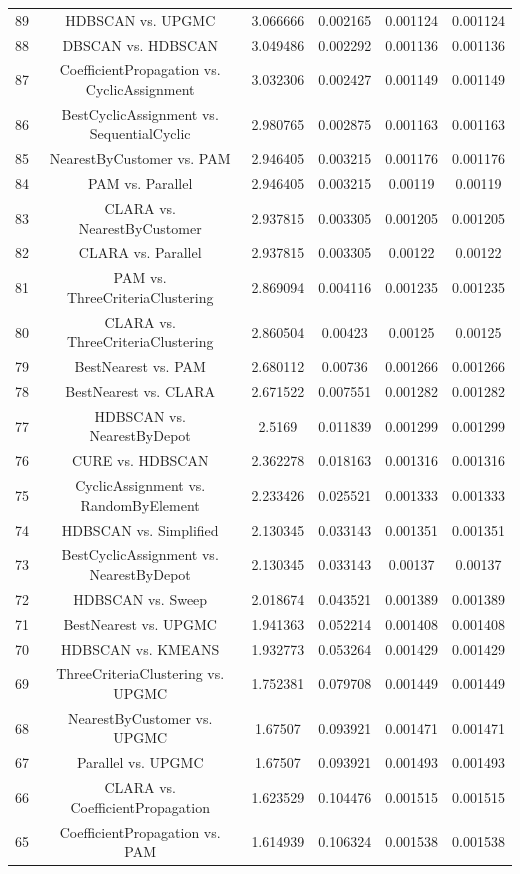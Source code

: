 \documentclass[a4paper,10pt]{article}
\begin{document}
\begin{landscape}
\begin{table}[!htp]
\begin{tabular}{cccccc}
89&HDBSCAN vs. UPGMC&3.066666&0.002165&0.001124&0.001124\\
88&DBSCAN vs. HDBSCAN&3.049486&0.002292&0.001136&0.001136\\
87&CoefficientPropagation vs. CyclicAssignment&3.032306&0.002427&0.001149&0.001149\\
86&BestCyclicAssignment vs. SequentialCyclic&2.980765&0.002875&0.001163&0.001163\\
85&NearestByCustomer vs. PAM&2.946405&0.003215&0.001176&0.001176\\
84&PAM vs. Parallel&2.946405&0.003215&0.00119&0.00119\\
83&CLARA vs. NearestByCustomer&2.937815&0.003305&0.001205&0.001205\\
82&CLARA vs. Parallel&2.937815&0.003305&0.00122&0.00122\\
81&PAM vs. ThreeCriteriaClustering&2.869094&0.004116&0.001235&0.001235\\
80&CLARA vs. ThreeCriteriaClustering&2.860504&0.00423&0.00125&0.00125\\
79&BestNearest vs. PAM&2.680112&0.00736&0.001266&0.001266\\
78&BestNearest vs. CLARA&2.671522&0.007551&0.001282&0.001282\\
77&HDBSCAN vs. NearestByDepot&2.5169&0.011839&0.001299&0.001299\\
76&CURE vs. HDBSCAN&2.362278&0.018163&0.001316&0.001316\\
75&CyclicAssignment vs. RandomByElement&2.233426&0.025521&0.001333&0.001333\\
74&HDBSCAN vs. Simplified&2.130345&0.033143&0.001351&0.001351\\
73&BestCyclicAssignment vs. NearestByDepot&2.130345&0.033143&0.00137&0.00137\\
72&HDBSCAN vs. Sweep&2.018674&0.043521&0.001389&0.001389\\
71&BestNearest vs. UPGMC&1.941363&0.052214&0.001408&0.001408\\
70&HDBSCAN vs. KMEANS&1.932773&0.053264&0.001429&0.001429\\
69&ThreeCriteriaClustering vs. UPGMC&1.752381&0.079708&0.001449&0.001449\\
68&NearestByCustomer vs. UPGMC&1.67507&0.093921&0.001471&0.001471\\
67&Parallel vs. UPGMC&1.67507&0.093921&0.001493&0.001493\\
66&CLARA vs. CoefficientPropagation&1.623529&0.104476&0.001515&0.001515\\
65&CoefficientPropagation vs. PAM&1.614939&0.106324&0.001538&0.001538\\

\end{tabular}
\end{table}
\end{landscape}
\end{document}
